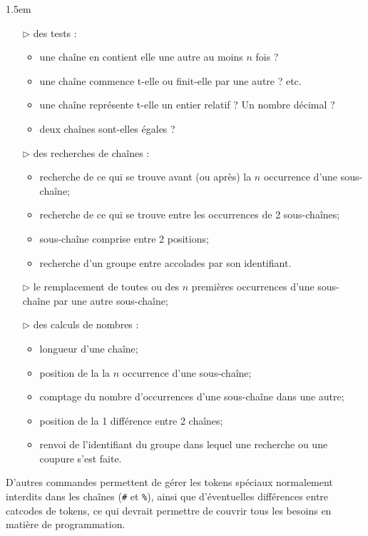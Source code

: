 \documentclass[a4paper,10pt]{article}
\begin{document}
\begin{titlepage}
\begin{center}
\begin{minipage}{0.85\linewidth}
			\parindent1.5em
			\begin{itemize}
				\item[$\triangleright$] des tests :
					\begin{itemize}
						\item une chaîne en contient elle une autre au moins $n$ fois ?
						\item une chaîne commence t-elle ou finit-elle par une autre ? etc.
						\item une chaîne représente t-elle un entier relatif ? Un nombre décimal ?
						\item deux chaînes sont-elles égales ?
					\end{itemize}
				\item[$\triangleright$] des recherches de chaînes :
					\begin{itemize}
						\item recherche de ce qui se trouve avant (ou après) la $n$\ieme{} occurrence d'une sous-chaîne;
						\item recherche de ce qui se trouve entre les occurrences de 2 sous-chaînes;
						\item sous-chaîne comprise entre 2 positions;
						\item recherche d'un groupe entre accolades par son identifiant.
					\end{itemize}
				\item[$\triangleright$] le remplacement de toutes ou des $n$ premières occurrences d'une sous-chaîne par une autre sous-chaîne;
				\item[$\triangleright$] des calculs de nombres :
					\begin{itemize}
						\item longueur d'une chaîne;
						\item position de la la $n$\ieme{} occurrence d'une sous-chaîne;
						\item comptage du nombre d'occurrences d'une sous-chaîne dans une autre;
						\item position de la 1\iere{} différence entre 2 chaînes;
						\item renvoi de l'identifiant du groupe dans lequel une recherche ou une coupure s'est faite.
					\end{itemize}
			\end{itemize}
			\setlength{\parindent}{0pt}
			\medskip
			D'autres commandes permettent de gérer les tokens spéciaux normalement interdits dans les chaînes (\verb|#| et \verb|%|), ainsi que d'éventuelles différences entre catcodes de tokens, ce qui devrait permettre de couvrir tous les besoins en matière de programmation.
		\end{minipage}
	\end{center}
	\hrulefill\vfill{}
\end{titlepage}
\end{document}
